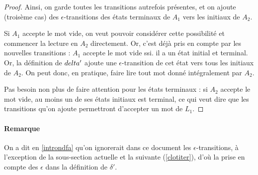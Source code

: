 \begin{proof}
Ainsi, on garde toutes les transitions autrefois présentes, et on ajoute (troisème cas) des $\epsilon$-transitions des états terminaux de $A_1$ vers les initiaux de $A_2$.

Si $A_1$ accepte le mot vide, on veut pouvoir considérer cette possibilité et commencer la lecture en $A_2$ directement. Or, c'est déjà pris en compte par les nouvelles transitions : $A_1$ accepte le mot vide ssi. il a un état initial et terminal. Or, la définition de $\\delta'$ ajoute une $\epsilon$-transition de cet état vers tous les initiaux de $A_2$. On peut donc, en pratique, faire lire tout mot donné intégralement par $A_2$.

Pas besoin non plus de faire attention pour les états terminaux : si $A_2$ accepte le mot vide, au moins un de ses états initiaux est terminal, ce qui veut dire que les transitions qu'on ajoute permettront d'accepter un mot de $L_1$.
\end{proof}

\paragraph*{Remarque} On a dit en \ref{introndfa} qu'on ignorerait dans ce document les $\epsilon$-transitions, à l'exception de la sous-section actuelle et la suivante (\ref{clotiter}), d'où la prise en compte des $\epsilon$ dans la définition de $\delta'$.

